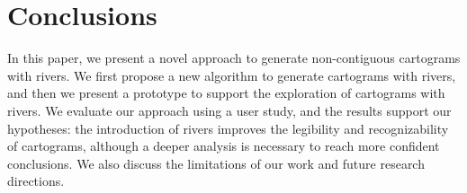 \section{Conclusions}

In this paper, we present a novel approach to generate non-contiguous cartograms with rivers. We first propose a new algorithm to generate cartograms with rivers, and then we present a prototype to support the exploration of cartograms with rivers. We evaluate our approach using a user study, and the results  support our hypotheses: the introduction of rivers improves the legibility and recognizability of cartograms, although a deeper analysis is necessary to reach more confident conclusions. We also discuss the limitations of our work and future research directions.